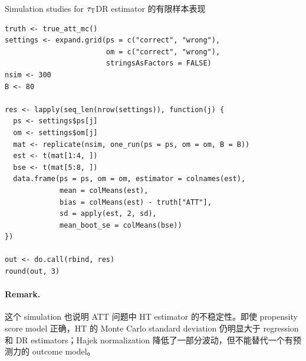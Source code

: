 \begin{exercisesolution}{Simulation studies for $\tau_\textsc{T}$}{DR estimator 的有限样本表现}
\begin{lstlisting}
truth <- true_att_mc()
settings <- expand.grid(ps = c("correct", "wrong"),
                        om = c("correct", "wrong"),
                        stringsAsFactors = FALSE)
nsim <- 300
B <- 80

res <- lapply(seq_len(nrow(settings)), function(j) {
  ps <- settings$ps[j]
  om <- settings$om[j]
  mat <- replicate(nsim, one_run(ps = ps, om = om, B = B))
  est <- t(mat[1:4, ])
  bse <- t(mat[5:8, ])
  data.frame(ps = ps, om = om, estimator = colnames(est),
             mean = colMeans(est),
             bias = colMeans(est) - truth["ATT"],
             sd = apply(est, 2, sd),
             mean_boot_se = colMeans(bse))
})

out <- do.call(rbind, res)
round(out, 3)
\end{lstlisting}

\paragraph{Remark.}
这个 simulation 也说明 ATT 问题中 HT estimator 的不稳定性。即使 propensity score model 正确，HT 的 Monte Carlo standard deviation 仍明显大于 regression 和 DR estimators；Hajek normalization 降低了一部分波动，但不能替代一个有预测力的 outcome model。
\end{exercisesolution}

